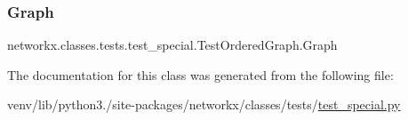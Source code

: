 \subsubsection{\texorpdfstring{Graph}{Graph}}
{\footnotesize\ttfamily networkx.\+classes.\+tests.\+test\+\_\+special.\+Test\+Ordered\+Graph.\+Graph}



The documentation for this class was generated from the following file\+:\begin{DoxyCompactItemize}
\item 
venv/lib/python3./site-\/packages/networkx/classes/tests/\hyperlink{test__special_8py}{test\+\_\+special.\+py}\end{DoxyCompactItemize}
